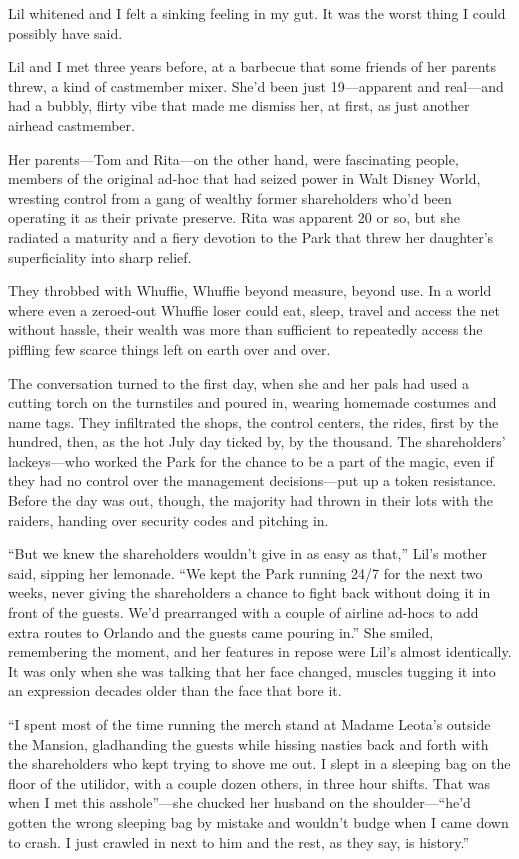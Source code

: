Lil whitened and I felt a sinking feeling in my gut. It was the
worst thing I could possibly have said.

Lil and I met three years before, at a barbecue that some friends
of her parents threw, a kind of castmember mixer. She'd been just
19—apparent and real—and had a bubbly, flirty vibe that made me
dismiss her, at first, as just another airhead castmember.

Her parents—Tom and Rita—on the other hand, were fascinating
people, members of the original ad-hoc that had seized power in
Walt Disney World, wresting control from a gang of wealthy former
shareholders who'd been operating it as their private preserve.
Rita was apparent 20 or so, but she radiated a maturity and a fiery
devotion to the Park that threw her daughter's superficiality into
sharp relief.

They throbbed with Whuffie, Whuffie beyond measure, beyond use. In
a world where even a zeroed-out Whuffie loser could eat, sleep,
travel and access the net without hassle, their wealth was more
than sufficient to repeatedly access the piffling few scarce things
left on earth over and over.

The conversation turned to the first day, when she and her pals had
used a cutting torch on the turnstiles and poured in, wearing
homemade costumes and name tags. They infiltrated the shops, the
control centers, the rides, first by the hundred, then, as the hot
July day ticked by, by the thousand. The shareholders' lackeys—who
worked the Park for the chance to be a part of the magic, even if
they had no control over the management decisions—put up a token
resistance. Before the day was out, though, the majority had thrown
in their lots with the raiders, handing over security codes and
pitching in.

“But we knew the shareholders wouldn't give in as easy as that,”
Lil's mother said, sipping her lemonade. “We kept the Park running
24/7 for the next two weeks, never giving the shareholders a chance
to fight back without doing it in front of the guests. We'd
prearranged with a couple of airline ad-hocs to add extra routes to
Orlando and the guests came pouring in.” She smiled, remembering
the moment, and her features in repose were Lil's almost
identically. It was only when she was talking that her face
changed, muscles tugging it into an expression decades older than
the face that bore it.

“I spent most of the time running the merch stand at Madame Leota's
outside the Mansion, gladhanding the guests while hissing nasties
back and forth with the shareholders who kept trying to shove me
out. I slept in a sleeping bag on the floor of the utilidor, with a
couple dozen others, in three hour shifts. That was when I met this
asshole”—she chucked her husband on the shoulder—“he'd gotten the
wrong sleeping bag by mistake and wouldn't budge when I came down
to crash. I just crawled in next to him and the rest, as they say,
is history.”

